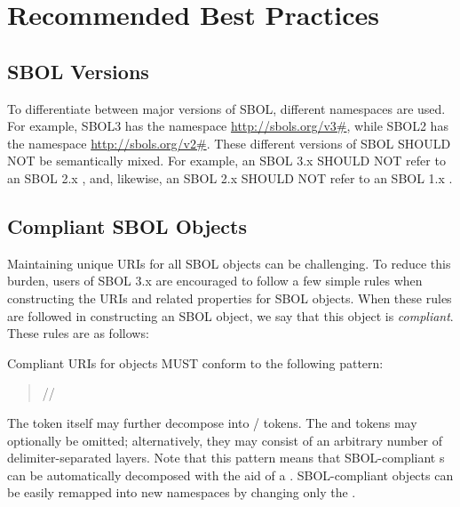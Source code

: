 \section{Recommended Best Practices}
\label{sec:bestpractices}
\subsection{SBOL Versions}

To differentiate between major versions of SBOL, different namespaces are used.  For example, SBOL3 has the namespace \url{http://sbols.org/v3#}, while SBOL2 has the namespace \url{http://sbols.org/v2#}.  These different versions of SBOL SHOULD NOT be semantically mixed. For example, an SBOL 3.x  SHOULD NOT refer to an SBOL 2.x , and, likewise, an SBOL 2.x  SHOULD NOT refer to an SBOL 1.x .

\subsection{Compliant SBOL Objects}
\label{sec:compliant}

Maintaining unique URIs for all SBOL objects can be challenging.  To reduce this burden, users of SBOL 3.x are encouraged to follow a few simple rules when constructing the URIs and related properties for SBOL objects.  When these rules are followed in constructing an SBOL object, we say that this object is \emph{compliant}. These rules are as follows:

Compliant URIs for  objects MUST conform to the following pattern:
\begin{quotation} 
//
\end{quotation}

The  token itself may further decompose into / tokens. The  and  tokens may optionally be omitted; alternatively, they may consist of an arbitrary number of delimiter-separated layers. Note that this pattern means that SBOL-compliant s can be automatically decomposed with the aid of a . SBOL-compliant objects can be easily remapped into new namespaces by changing only the .

